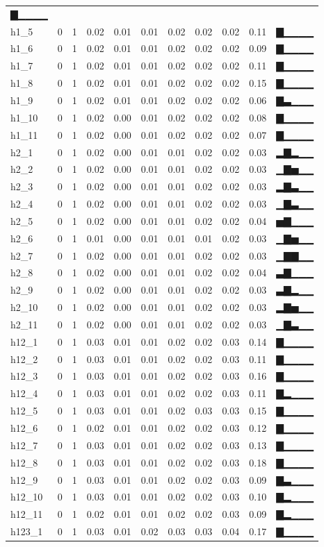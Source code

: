 \documentclass[]{article}
\begin{document}
\begin{longtable}[]{@{}lrrrrrrrrrl@{}}
▇▁▁▁▁\tabularnewline
h1\_5 & 0 & 1 & 0.02 & 0.01 & 0.01 & 0.02 & 0.02 & 0.02 & 0.11 &
▇▁▁▁▁\tabularnewline
h1\_6 & 0 & 1 & 0.02 & 0.01 & 0.01 & 0.02 & 0.02 & 0.02 & 0.09 &
▇▁▁▁▁\tabularnewline
h1\_7 & 0 & 1 & 0.02 & 0.01 & 0.01 & 0.02 & 0.02 & 0.02 & 0.11 &
▇▁▁▁▁\tabularnewline
h1\_8 & 0 & 1 & 0.02 & 0.01 & 0.01 & 0.02 & 0.02 & 0.02 & 0.15 &
▇▁▁▁▁\tabularnewline
h1\_9 & 0 & 1 & 0.02 & 0.01 & 0.01 & 0.02 & 0.02 & 0.02 & 0.06 &
▇▃▁▁▁\tabularnewline
h1\_10 & 0 & 1 & 0.02 & 0.00 & 0.01 & 0.02 & 0.02 & 0.02 & 0.08 &
▇▁▁▁▁\tabularnewline
h1\_11 & 0 & 1 & 0.02 & 0.00 & 0.01 & 0.02 & 0.02 & 0.02 & 0.07 &
▇▁▁▁▁\tabularnewline
h2\_1 & 0 & 1 & 0.02 & 0.00 & 0.01 & 0.01 & 0.02 & 0.02 & 0.03 &
▂▇▂▁▁\tabularnewline
h2\_2 & 0 & 1 & 0.02 & 0.00 & 0.01 & 0.01 & 0.02 & 0.02 & 0.03 &
▁▇▅▁▁\tabularnewline
h2\_3 & 0 & 1 & 0.02 & 0.00 & 0.01 & 0.01 & 0.02 & 0.02 & 0.03 &
▂▇▃▁▁\tabularnewline
h2\_4 & 0 & 1 & 0.02 & 0.00 & 0.01 & 0.01 & 0.02 & 0.02 & 0.03 &
▁▇▃▁▁\tabularnewline
h2\_5 & 0 & 1 & 0.02 & 0.00 & 0.01 & 0.01 & 0.02 & 0.02 & 0.04 &
▅▇▁▁▁\tabularnewline
h2\_6 & 0 & 1 & 0.01 & 0.00 & 0.01 & 0.01 & 0.01 & 0.02 & 0.03 &
▁▇▅▁▁\tabularnewline
h2\_7 & 0 & 1 & 0.02 & 0.00 & 0.01 & 0.01 & 0.02 & 0.02 & 0.03 &
▁▇▇▁▁\tabularnewline
h2\_8 & 0 & 1 & 0.02 & 0.00 & 0.01 & 0.01 & 0.02 & 0.02 & 0.04 &
▃▇▁▁▁\tabularnewline
h2\_9 & 0 & 1 & 0.02 & 0.00 & 0.01 & 0.01 & 0.02 & 0.02 & 0.03 &
▃▇▂▁▁\tabularnewline
h2\_10 & 0 & 1 & 0.02 & 0.00 & 0.01 & 0.01 & 0.02 & 0.02 & 0.03 &
▂▇▅▁▁\tabularnewline
h2\_11 & 0 & 1 & 0.02 & 0.00 & 0.01 & 0.01 & 0.02 & 0.02 & 0.03 &
▁▇▃▁▁\tabularnewline
h12\_1 & 0 & 1 & 0.03 & 0.01 & 0.01 & 0.02 & 0.02 & 0.03 & 0.14 &
▇▁▁▁▁\tabularnewline
h12\_2 & 0 & 1 & 0.03 & 0.01 & 0.01 & 0.02 & 0.02 & 0.03 & 0.11 &
▇▁▁▁▁\tabularnewline
h12\_3 & 0 & 1 & 0.03 & 0.01 & 0.01 & 0.02 & 0.02 & 0.03 & 0.16 &
▇▁▁▁▁\tabularnewline
h12\_4 & 0 & 1 & 0.03 & 0.01 & 0.01 & 0.02 & 0.02 & 0.03 & 0.11 &
▇▂▁▁▁\tabularnewline
h12\_5 & 0 & 1 & 0.03 & 0.01 & 0.01 & 0.02 & 0.03 & 0.03 & 0.15 &
▇▁▁▁▁\tabularnewline
h12\_6 & 0 & 1 & 0.02 & 0.01 & 0.01 & 0.02 & 0.02 & 0.03 & 0.12 &
▇▁▁▁▁\tabularnewline
h12\_7 & 0 & 1 & 0.03 & 0.01 & 0.01 & 0.02 & 0.02 & 0.03 & 0.13 &
▇▁▁▁▁\tabularnewline
h12\_8 & 0 & 1 & 0.03 & 0.01 & 0.01 & 0.02 & 0.02 & 0.03 & 0.18 &
▇▁▁▁▁\tabularnewline
h12\_9 & 0 & 1 & 0.03 & 0.01 & 0.01 & 0.02 & 0.02 & 0.03 & 0.09 &
▇▃▁▁▁\tabularnewline
h12\_10 & 0 & 1 & 0.03 & 0.01 & 0.01 & 0.02 & 0.02 & 0.03 & 0.10 &
▇▂▁▁▁\tabularnewline
h12\_11 & 0 & 1 & 0.02 & 0.01 & 0.01 & 0.02 & 0.02 & 0.03 & 0.09 &
▇▂▁▁▁\tabularnewline
h123\_1 & 0 & 1 & 0.03 & 0.01 & 0.02 & 0.03 & 0.03 & 0.04 & 0.17 &
▇▁▁▁▁\tabularnewline

\end{longtable}
\end{document}
